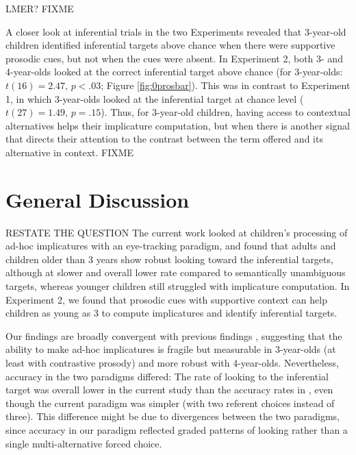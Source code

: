 \documentclass[10pt,letterpaper]{article}
\begin{document}
LMER? FIXME %

A closer look at inferential trials in the two Experiments revealed that 3-year-old children identified inferential targets above chance when there were supportive prosodic cues, but not when the cues were absent. In Experiment 2, both 3- and 4-year-olds looked at the correct inferential target above chance (for 3-year-olds: $t(16) = 2.47$, $p < .03$; Figure \ref{fig:0prosbar}). This was in contrast to Experiment 1, in which 3-year-olds looked at the inferential target at chance level ($t(27) = 1.49$, $p = .15$). Thus, for 3-year-old children, having access to contextual alternatives helps their implicature computation, but when there is another signal that directs their attention to the contrast between the term offered and its alternative in context. FIXME

\section{General Discussion}

RESTATE THE QUESTION The current work looked at children's processing of ad-hoc implicatures with an eye-tracking paradigm, and found that adults and children older than 3 years show robust looking toward the inferential targets, although at slower and overall lower rate compared to semantically unambiguous targets, whereas younger children still struggled with implicature computation. In Experiment 2, we found that prosodic cues with supportive context can help children as young as 3 to compute implicatures and identify inferential targets.

Our findings are broadly convergent with previous findings \cite{stillerLLD}, suggesting that the ability to make ad-hoc implicatures is fragile but measurable in 3-year-olds (at least with contrastive prosody) and more robust with 4-year-olds. Nevertheless, accuracy in the two paradigms differed: The rate of looking to the inferential target was overall lower in the current study than the accuracy rates in , even though the current paradigm was simpler (with two referent choices instead of three). This difference might be due to divergences between the two paradigms, since accuracy in our paradigm reflected graded patterns of looking rather than a single multi-alternative forced choice. 
\end{document}
